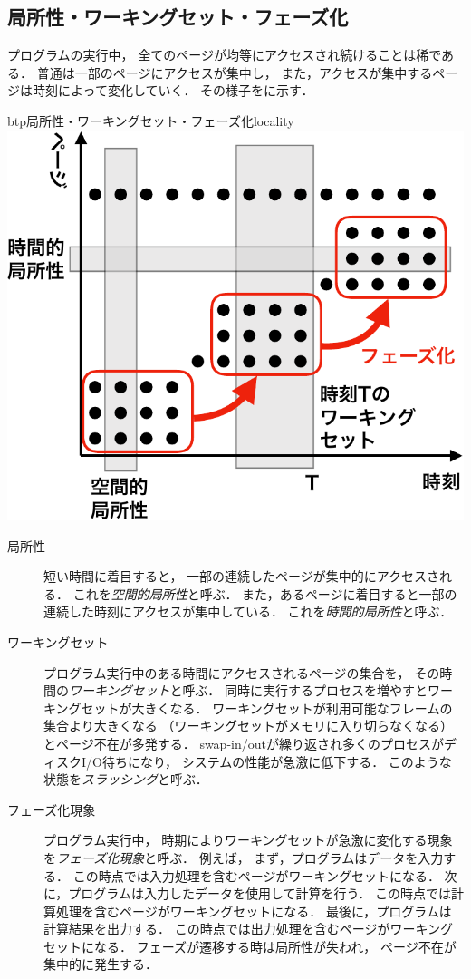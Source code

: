 \subsection{局所性・ワーキングセット・フェーズ化}
プログラムの実行中，
全てのページが均等にアクセスされ続けることは稀である．
普通は一部のページにアクセスが集中し，
また，アクセスが集中するページは時刻によって変化していく．
その様子をに示す．

\begin{myfig}{btp}{局所性・ワーキングセット・フェーズ化}{locality}
  \includegraphics[scale=0.66]{Fig/locality-crop.pdf}
\end{myfig}

\begin{description}
\item[局所性]
  短い時間に着目すると，
  一部の連続したページが集中的にアクセスされる．
  これを\emph{空間的局所性}と呼ぶ．
  また，あるページに着目すると一部の連続した時刻にアクセスが集中している．
  これを\emph{時間的局所性}と呼ぶ．
\item[ワーキングセット]
  プログラム実行中のある時間にアクセスされるページの集合を，
  その時間の\emph{ワーキングセット}と呼ぶ．
  同時に実行するプロセスを増やすとワーキングセットが大きくなる．
  ワーキングセットが利用可能なフレームの集合より大きくなる
  （ワーキングセットがメモリに入り切らなくなる）とページ不在が多発する．
  swap-in/outが繰り返され多くのプロセスがディスクI/O待ちになり，
  システムの性能が急激に低下する．
  このような状態を\emph{スラッシング}と呼ぶ．
\item[フェーズ化現象]
  プログラム実行中，
  時期によりワーキングセットが急激に変化する現象を\emph{フェーズ化現象}と呼ぶ．
  例えば，
  まず，プログラムはデータを入力する．
  この時点では入力処理を含むページがワーキングセットになる．
  次に，プログラムは入力したデータを使用して計算を行う．
  この時点では計算処理を含むページがワーキングセットになる．
  最後に，プログラムは計算結果を出力する．
  この時点では出力処理を含むページがワーキングセットになる．
  フェーズが遷移する時は局所性が失われ，
  ページ不在が集中的に発生する．
\end{description}

